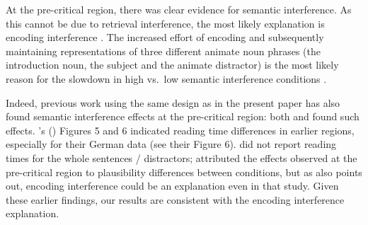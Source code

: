 \documentclass[a4paper, man, floatsintext]{apa7}
\begin{document}
At the pre-critical region, there was clear evidence for semantic interference. As this cannot be due to retrieval interference, the most likely explanation is encoding interference \citep{Oberauer_Kliegl_2006}. The increased effort of encoding and subsequently maintaining representations of three different animate noun phrases (the introduction noun, the subject and the animate distractor) is the most likely reason for the slowdown in high vs.\ low semantic interference conditions \citep[for similar findings, see e.g., ][]{lago_etal_2021, kush_etal_2015, gordon02}. 

Indeed, previous work using the same design as in the present paper has also found semantic interference effects at the pre-critical region: both \textcite{vandyke07} and \textcite{mertzen} found such effects. \citeauthor{mertzen}'s (\citeyear{mertzen}) Figures 5 and 6 indicated reading time differences in earlier regions, especially for their German data (see their Figure 6). \textcite{vandyke07} did not report reading times for the whole sentences / distractors;  \citeauthor{vandyke07} attributed the effects observed at the pre-critical region to plausibility differences between conditions, but as \textcite{mertzen} also points out, encoding interference could be an explanation even in that study. Given these earlier findings, our results are consistent with the encoding interference explanation.
\end{document}
